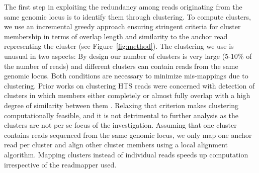 \documentclass[a4paper]{article}
\begin{document}
The first step in exploiting the redundancy among reads originating
from the same genomic locus is to identify them through clustering.
To compute clusters, we use an incremental greedy approach
ensuring stringent criteria for cluster membership in terms of overlap length
and similarity to the anchor read representing the cluster (see Figure~\ref{fig:method}).
The clustering we use is unusual in two aspects: By design our number of clusters is very large (5-10\% of the number of reads) and different clusters can contain reads from the same genomic locus. Both conditions are necessary to minimize mis-mappings due to clustering.
Prior works on clustering HTS reads were concerned with detection
of clusters in which members either completely or almost fully
overlap with a high degree of similarity between them \cite{Bao:2011ia,Shimizu:2011it,Edgar01102010}.
Relaxing that criterion makes clustering computationally feasible,
and it is not detrimental to further analysis as the clusters are not per
se focus of the investigation.
Assuming that one cluster contains reads sequenced
from the same genomic locus, we only map one anchor
read per cluster and align other cluster members using a local alignment
algorithm. Mapping clusters instead of individual reads speeds up
computation irrespective of the readmapper used.
\end{document}
